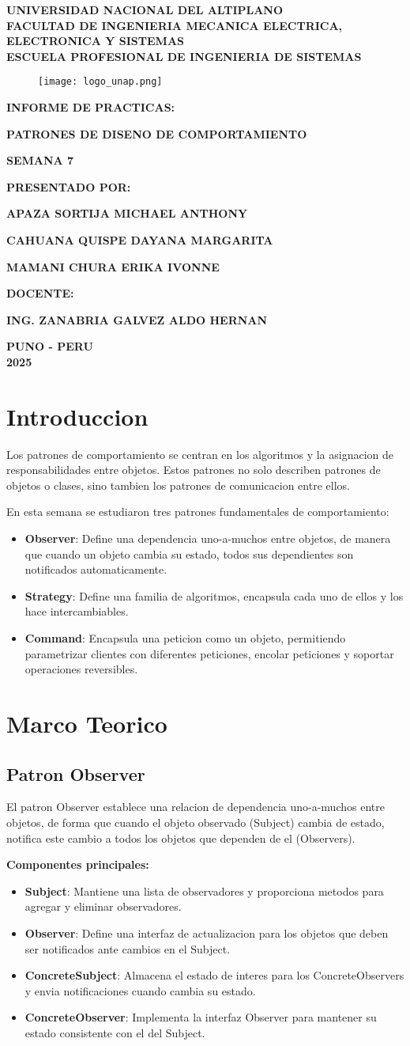 \documentclass[11pt,a4paper]{article}
\newcommand{\Institution}{Universidad Nacional del Altiplano\xspace}
\renewcommand{\maketitle}
{
    \thispagestyle{empty}
    \begin{center}
        {\fontsize{18pt}{1em} \textbf{\MakeUppercase{\Institution}}}\\
        \vspace*{0.34cm}
        {\fontsize{16pt}{1em} \textbf{\MakeUppercase{Facultad de Ingenieria Mecanica Electrica, Electronica y Sistemas}}}\\
        \vspace*{0.34cm}
        {\fontsize{14pt}{1em} \textbf{\MakeUppercase{Escuela Profesional de Ingenieria de Sistemas}}}\\
    \end{center}        
    \vspace*{1.2cm}
    
    \begin{figure}[h]
    \center
    \texttt{[image: logo\_unap.png]}
    \end{figure}

    \begin{center}
        \vspace*{1.05cm}
        {\fontsize{14pt}{1em} \textbf {INFORME DE PRACTICAS:} \par}
        \vspace*{0.6cm}
        \begin{spacing}{1.5}
        {\fontsize{14pt}{1em} \textbf {PATRONES DE DISENO DE COMPORTAMIENTO} \par}
        {\fontsize{14pt}{1em} \textbf {SEMANA 7} \par}
        \end{spacing}
        \vspace*{1.05cm}
        {\fontsize{14pt}{1em} \textbf {PRESENTADO POR:}\par}
        \vspace*{0.45cm}
        {\fontsize{14pt}{1em} \textbf {APAZA SORTIJA MICHAEL ANTHONY} \par}
        {\fontsize{14pt}{1em} \textbf {CAHUANA QUISPE DAYANA MARGARITA} \par}
        {\fontsize{14pt}{1em} \textbf {MAMANI CHURA ERIKA IVONNE} \par}
        \vspace*{0.6cm}
        {\fontsize{14pt}{1em} \textbf{DOCENTE:} \par}
        \vspace*{0.6cm}
        {\fontsize{16pt}{1em} \textbf{\MakeUppercase{Ing. Zanabria Galvez Aldo Hernan}} \par}
        \vspace*{1.05cm}
        {\fontsize{14pt}{1em} \textbf{PUNO - PERU}}\\
        \vspace*{0.45cm}
        {\fontsize{14pt}{1em} \textbf{2025}}
    \end{center}
    
    \pagebreak
}
\begin{document}
\maketitle

\section{Introduccion}

Los patrones de comportamiento se centran en los algoritmos y la asignacion de responsabilidades entre objetos. Estos patrones no solo describen patrones de objetos o clases, sino tambien los patrones de comunicacion entre ellos.

En esta semana se estudiaron tres patrones fundamentales de comportamiento:

\begin{itemize}
    \item \textbf{Observer}: Define una dependencia uno-a-muchos entre objetos, de manera que cuando un objeto cambia su estado, todos sus dependientes son notificados automaticamente.
    \item \textbf{Strategy}: Define una familia de algoritmos, encapsula cada uno de ellos y los hace intercambiables.
    \item \textbf{Command}: Encapsula una peticion como un objeto, permitiendo parametrizar clientes con diferentes peticiones, encolar peticiones y soportar operaciones reversibles.
\end{itemize}

\section{Marco Teorico}

\subsection{Patron Observer}

El patron Observer establece una relacion de dependencia uno-a-muchos entre objetos, de forma que cuando el objeto observado (Subject) cambia de estado, notifica este cambio a todos los objetos que dependen de el (Observers).

\textbf{Componentes principales:}
\begin{itemize}
    \item \textbf{Subject}: Mantiene una lista de observadores y proporciona metodos para agregar y eliminar observadores.
    \item \textbf{Observer}: Define una interfaz de actualizacion para los objetos que deben ser notificados ante cambios en el Subject.
    \item \textbf{ConcreteSubject}: Almacena el estado de interes para los ConcreteObservers y envia notificaciones cuando cambia su estado.
    \item \textbf{ConcreteObserver}: Implementa la interfaz Observer para mantener su estado consistente con el del Subject.
\end{itemize}
\end{document}
